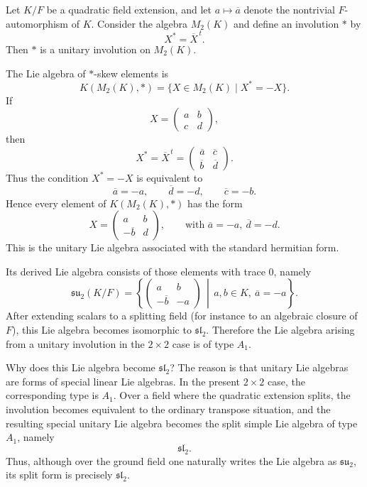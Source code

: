 \begin{example}
    Let $K/F$ be a quadratic field extension, and let $a \mapsto \overline{a}$ denote the nontrivial
    $F$-automorphism of $K$. Consider the algebra $M_2(K)$ and define an involution $*$ by
    \[
        X^* = \overline{X}^{\,t}.
    \]
    Then $*$ is a unitary involution on $M_2(K)$.

    The Lie algebra of $*$-skew elements is
    \[
        K(M_2(K),*)=\{X\in M_2(K)\mid X^*=-X\}.
    \]
    If
    \[
        X=\begin{pmatrix} a & b \\ c & d \end{pmatrix},
    \]
    then
    \[
        X^*=\overline{X}^{\,t}
        =
        \begin{pmatrix}
            \overline{a} & \overline{c} \\
            \overline{b} & \overline{d}
        \end{pmatrix}.
    \]
    Thus the condition $X^*=-X$ is equivalent to
    \[
        \overline{a}=-a,\qquad \overline{d}=-d,\qquad \overline{c}=-b.
    \]
    Hence every element of $K(M_2(K),*)$ has the form
    \[
        X=
        \begin{pmatrix}
            a             & b \\
            -\overline{b} & d
        \end{pmatrix},
        \qquad \text{with } \overline{a}=-a,\ \overline{d}=-d.
    \]
    This is the unitary Lie algebra associated with the standard hermitian form.

    Its derived Lie algebra consists of those elements with trace $0$, namely
    \[
        \mathfrak{su}_2(K/F)
        =
        \left\{
        \begin{pmatrix}
            a             & b  \\
            -\overline{b} & -a
        \end{pmatrix}
        \,\middle|\,
        a,b\in K,\ \overline{a}=-a
        \right\}.
    \]
    After extending scalars to a splitting field (for instance to an algebraic closure of $F$),
    this Lie algebra becomes isomorphic to $\mathfrak{sl}_2$. Therefore the Lie algebra arising
    from a unitary involution in the $2\times 2$ case is of type $A_1$.
\end{example}

\begin{remark}
    Why does this Lie algebra become $\mathfrak{sl}_2$? The reason is that unitary Lie algebras are
    forms of special linear Lie algebras. In the present $2\times 2$ case, the corresponding type is
    $A_1$. Over a field where the quadratic extension splits, the involution becomes equivalent to the
    ordinary transpose situation, and the resulting special unitary Lie algebra becomes the split simple
    Lie algebra of type $A_1$, namely
    \[
        \mathfrak{sl}_2.
    \]
    Thus, although over the ground field one naturally writes the Lie algebra as $\mathfrak{su}_2$,
    its split form is precisely $\mathfrak{sl}_2$.
\end{remark}

